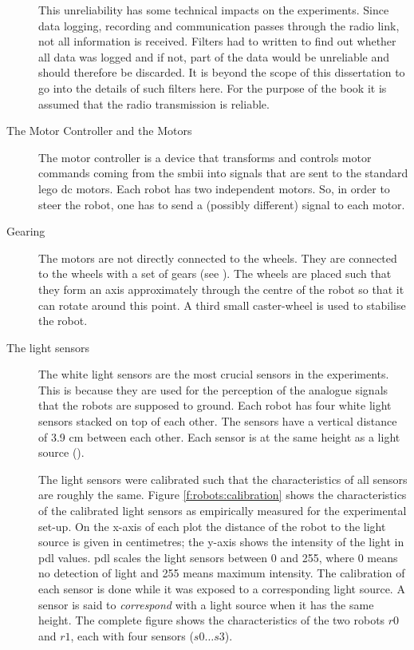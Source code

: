 \begin{description}
This unreliability has some technical impacts on the experiments. Since data logging, recording and communication passes through the radio link, not all information is received. Filters had to written to find out whether all data was logged and if not, part of the data would be unreliable and should therefore be discarded. It is beyond the scope of this dissertation to go into the details of such filters here. For the purpose  of the book it is assumed that the radio transmission is reliable.

\item[The Motor Controller and the Motors] The motor controller is a device that transforms and controls motor commands coming from the {\sc smbii} into signals that are sent to the standard {\sc lego dc} motors. Each robot has two independent motors. So, in order to steer the robot, one has to send a (possibly different) signal to each motor.

\item[Gearing] The motors are not directly connected to the wheels. They are connected to the wheels with a set of gears (see ). The wheels are placed such that they form an axis approximately through the centre of the robot so that it can rotate around this point. A third small caster-wheel is used to stabilise the robot. 

\item[The light sensors] The white light sensors are the most crucial sensors in the experiments. This is because they are used for the perception of the analogue signals that the robots are supposed to ground. Each robot has four white light sensors stacked on top of each other. The sensors have a vertical distance of 3.9 cm between each other. Each sensor is at the same height as a light source (). 

The light sensors were calibrated such that the characteristics of all sensors are roughly the same. Figure \ref{f:robots:calibration} shows the characteristics of the calibrated light sensors as empirically measured for the experimental set-up. On the x-axis of each plot the distance of the robot to the light source is given in centimetres; the y-axis shows the intensity of the light in {\sc pdl} values. {\sc pdl} scales the light sensors between 0 and 255, where 0 means no detection of light and 255 means maximum intensity. The calibration of each sensor is done while it was exposed to a corresponding light source. A sensor is said to {\em correspond} with a light source when it has the same height. The complete figure shows the characteristics of the two robots $r0$ and $r1$, each with four sensors ($s0 \ldots s3$).


\end{description}
